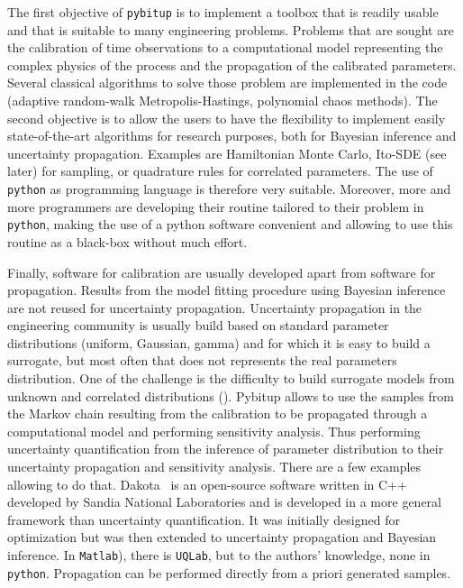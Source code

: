 \documentclass[a4paper,11pt]{article}
\begin{document}
The first objective of \texttt{pybitup} is to implement a toolbox that is readily usable and that is suitable to many engineering problems. Problems that are sought are the calibration of time observations to a computational model representing the complex physics of the process and the propagation of the calibrated parameters. Several classical algorithms to solve those problem are implemented in the code (adaptive random-walk Metropolis-Hastings, polynomial chaos methods). The second objective is to allow the users to have the flexibility to implement easily state-of-the-art algorithms for research purposes, both for Bayesian inference and uncertainty propagation. Examples are Hamiltonian Monte Carlo, Ito-SDE (see later) for sampling, or quadrature rules for correlated parameters. The use of \texttt{python} as programming language is therefore very suitable. Moreover, more and more programmers are developing their routine tailored to their problem in \texttt{python}, making the use of a python software convenient and allowing to use this routine as a black-box without much effort. 

Finally, software for calibration are usually developed apart from software for propagation. Results from the model fitting procedure using Bayesian inference are not reused for uncertainty propagation. Uncertainty propagation in the engineering community is usually build based on standard parameter distributions (uniform, Gaussian, gamma) and for which it is easy to build a surrogate, but most often that does not represents the real parameters distribution. One of the challenge is the difficulty to build surrogate models from unknown and correlated distributions (\cite{Jakeman_2019}). Pybitup allows to use the samples from the Markov chain resulting from the calibration to be propagated through a computational model and performing sensitivity analysis. Thus performing uncertainty quantification from the inference of parameter distribution to their uncertainty propagation and sensitivity analysis. There are a few examples allowing to do that. Dakota~\cite{dakota_6_10} is an open-source software written in C++ developed by Sandia National Laboratories and is developed in a more general framework than uncertainty quantification. It was initially designed for optimization but was then extended to uncertainty propagation and Bayesian inference. In \texttt{Matlab}), there is \texttt{UQLab}, but to the authors' knowledge, none in \texttt{python}. Propagation can be performed directly from a priori generated samples.  
\end{document}
